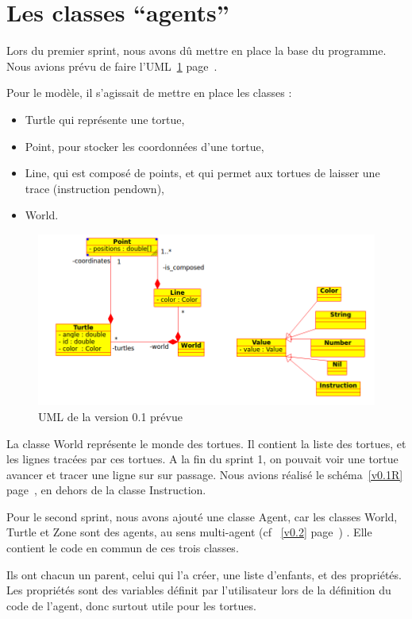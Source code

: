 \section{Les classes \enquote{agents}}
Lors du premier sprint, nous avons dû mettre en place la base du programme. Nous avions prévu de faire l'UML~\ref{v0.1} page~\pageref{v0.1}.

 Pour le modèle, il s'agissait de mettre en place les classes :
\begin{itemize}
\item Turtle qui représente une tortue, 
\item Point, pour stocker les coordonnées d'une tortue,
\item Line, qui est composé de points, et qui permet aux tortues de laisser une trace (instruction pendown),
\item World.
\end{itemize}


\begin{figure}[h]
\caption{\label{v0.1} UML de la version 0.1 prévue}
\includegraphics[scale=0.5]{doc/report/uml/v01.png}
\end{figure}


La classe World représente le monde des tortues. Il contient la liste des tortues, et les lignes tracées par ces tortues.
A la fin du sprint 1, on pouvait voir une tortue avancer et tracer une ligne sur sur passage.
Nous avions réalisé le schéma~\ref{v0.1R} page~\pageref{v0.1R}, en dehors de la classe Instruction.


Pour le second sprint, nous avons ajouté une classe Agent, car les classes World, Turtle et Zone sont des agents, au sens multi-agent (cf ~\ref{v0.2} page~\pageref{v0.2}) . Elle contient le code en commun de ces trois classes.
 
Ils ont chacun un parent, celui qui l'a créer, une liste d'enfants, et des propriétés. Les propriétés sont des variables définit par l'utilisateur lors de la définition du code de l'agent, donc surtout utile pour les tortues.



